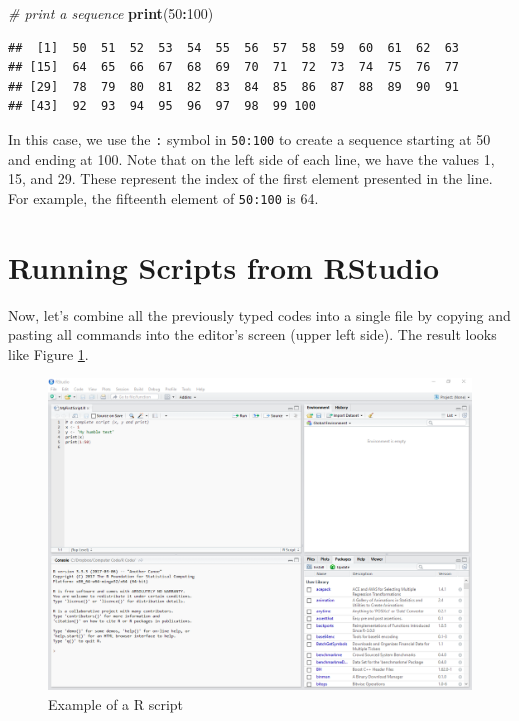 \documentclass[11pt,]{book}
\newenvironment{Shaded}{\begin{snugshade}}{\end{snugshade}}
\newcommand{\KeywordTok}[1]{\textcolor[rgb]{0.27,0.27,0.27}{\textbf{#1}}}
\newcommand{\DecValTok}[1]{\textcolor[rgb]{0.06,0.06,0.06}{#1}}
\newcommand{\CommentTok}[1]{\textcolor[rgb]{0.56,0.35,0.01}{\textit{#1}}}
\newcommand{\OperatorTok}[1]{\textcolor[rgb]{0.81,0.36,0.00}{\textbf{#1}}}
\newcommand{\NormalTok}[1]{#1}
\begin{document}
\begin{Shaded}
\begin{Highlighting}[]
\CommentTok{# print a sequence}
\KeywordTok{print}\NormalTok{(}\DecValTok{50}\OperatorTok{:}\DecValTok{100}\NormalTok{)}
\end{Highlighting}
\end{Shaded}

\begin{verbatim}
##  [1]  50  51  52  53  54  55  56  57  58  59  60  61  62  63
## [15]  64  65  66  67  68  69  70  71  72  73  74  75  76  77
## [29]  78  79  80  81  82  83  84  85  86  87  88  89  90  91
## [43]  92  93  94  95  96  97  98  99 100
\end{verbatim}

In this case, we use the \texttt{:} symbol in \texttt{50:100} to create
a sequence starting at 50 and ending at 100. Note that on the left side
of each line, we have the values 1, 15, and 29. These represent the
index of the first element presented in the line. For example, the
fifteenth element of \texttt{50:100} is 64.

\section{Running Scripts from
RStudio}\label{running-scripts-from-rstudio}

Now, let's combine all the previously typed codes into a single file by
copying and pasting all commands into the editor's screen (upper left
side). The result looks like Figure \ref{fig:example-script}.

\begin{figure}[!htbp]

{\centering \includegraphics[width=1\linewidth]{figs/RStudio_example_script} 

}

\caption{Example of a R script}\label{fig:example-script}
\end{figure}
\end{document}
